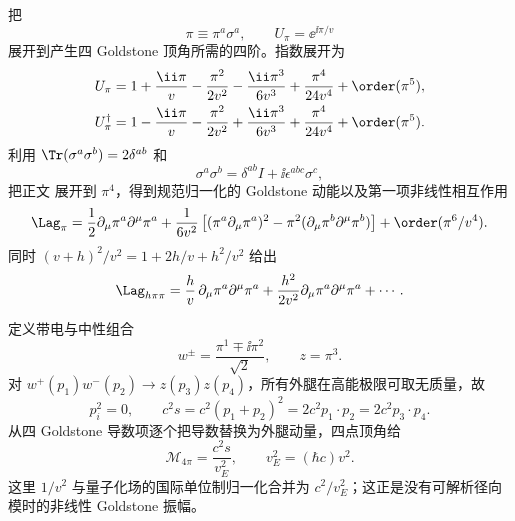 \begin{derivation}[纵向矢量散射中的高能增长与抵消]
把
\[
 \pi\equiv\pi^a\sigma^a,
 \qquad
 U_\pi=\ee^{\ii\pi/v}
\]
展开到产生四 Goldstone 顶角所需的四阶。指数展开为
\begin{align*}
 U_\pi
 &=1+\frac{\ii\pi}{v}-\frac{\pi^2}{2v^2}
 -\frac{\ii\pi^3}{6v^3}+\frac{\pi^4}{24v^4}+\order(\pi^5),\\
 U_\pi^\dagger
 &=1-\frac{\ii\pi}{v}-\frac{\pi^2}{2v^2}
 +\frac{\ii\pi^3}{6v^3}+\frac{\pi^4}{24v^4}+\order(\pi^5).
\end{align*}
利用 $\Tr(\sigma^a\sigma^b)=2\delta^{ab}$ 和
\[
 \sigma^a\sigma^b=\delta^{ab}I+\ii\epsilon^{abc}\sigma^c,
\]
把正文 展开到 $\pi^4$，得到规范归一化的 Goldstone 动能以及第一项非线性相互作用
\begin{equation*}
 \Lag_{\pi}
 =\frac12\partial_\mu\pi^a\partial^\mu\pi^a
 +\frac{1}{6v^2}
 \left[
 (\pi^a\partial_\mu\pi^a)^2
 -\pi^2(\partial_\mu\pi^b\partial^\mu\pi^b)
 \right]
 +\order(\pi^6/v^4).
\end{equation*}
同时 $(v+h)^2/v^2=1+2h/v+h^2/v^2$ 给出
\begin{equation*}
 \Lag_{h\pi\pi}
 =\frac{h}{v}\,
 \partial_\mu\pi^a\partial^\mu\pi^a+\frac{h^2}{2v^2}
 \partial_\mu\pi^a\partial^\mu\pi^a+\cdots .
\end{equation*}

定义带电与中性组合
\begin{equation*}
 w^\pm=\frac{\pi^1\mp\ii\pi^2}{\sqrt2},
 \qquad z=\pi^3.
\end{equation*}
对 $w^+(p_1)w^-(p_2)\to z(p_3)z(p_4)$，所有外腿在高能极限可取无质量，故
\begin{equation*}
 p_i^2=0,
 \qquad
 c^2s=c^2(p_1+p_2)^2=2c^2p_1\cdot p_2=2c^2p_3\cdot p_4.
\end{equation*}
从四 Goldstone 导数项逐个把导数替换为外腿动量，四点顶角给
\begin{equation*}
 \mathcal M_{4\pi}
 =\frac{c^2s}{v_E^2},
 \qquad v_E^2=(\hbar c)v^2.
\end{equation*}
这里 $1/v^2$ 与量子化场的国际单位制归一化合并为 $c^2/v_E^2$；这正是没有可解析径向模时的非线性 Goldstone 振幅。


\end{derivation}
